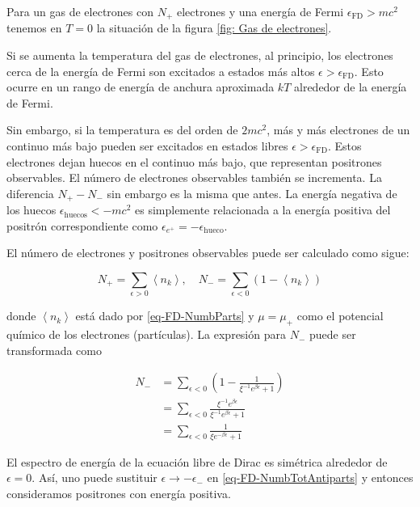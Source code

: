 Para un gas de electrones con ${N}_{+}$ electrones y una energía de Fermi ${\epsilon}_{\mathrm{FD}} > m{c}^{2}$ tenemos en $T=0$ la situación de la figura \ref{fig: Gas de electrones}.

Si se aumenta la temperatura del gas de electrones, al principio, los electrones cerca de la energía de Fermi son excitados a estados más altos ${\epsilon} > {\epsilon}_{\mathrm{FD}}$. Esto ocurre en un rango de energía de anchura aproximada $kT$ alrededor de la energía de Fermi.

Sin embargo, si la temperatura es del orden de $2m{c}^{2}$, más y más electrones de un continuo más bajo pueden ser excitados en estados libres $\epsilon > {\epsilon}_{\mathrm{FD}}$. Estos electrones dejan huecos en el continuo más bajo, que representan positrones observables. El número de electrones observables también se incrementa. La diferencia ${N}_{+} - {N}_{-}$ sin embargo es la misma que antes. La energía negativa de los huecos ${\epsilon}_{\mathrm{huecos}} < - m{c}^{2}$ es simplemente relacionada a la energía positiva del positrón correspondiente como ${\epsilon}_{{e}^{+}} = - {\epsilon}_{\mathrm{hueco}}$.

El número de electrones y positrones observables puede ser calculado como sigue:

\begin{equation}\label{eq-FD-NumbPartsAndAntiparts}
{N}_{+} = \sum_{\epsilon>0} \left\langle {n}_{k} \right\rangle, \quad {N}_{-} = \sum_{\epsilon<0} \left(1 - \left\langle {n}_{k} \right\rangle \right)
\end{equation}

donde $\left\langle {n}_{k} \right\rangle$ está dado por \eqref{eq-FD-NumbParts} y ${\mu} = {\mu}_{+}$ como el potencial químico de los electrones (partículas). La expresión para ${N}_{-}$ puede ser transformada como

\begin{equation}\label{eq-FD-NumbTotAntiparts}
\begin{split}
{N}_{-} & = \sum_{\epsilon < 0} \left( 1 - \frac{1}{{\xi}^{-1}{e}^{\beta{\epsilon}} + 1} \right)  \\
& = \sum_{\epsilon < 0}\frac{{\xi}^{-1}{e}^{\beta \epsilon}}{{\xi}^{-1}{e}^{\beta{\epsilon}} + 1} \\
& = \sum_{\epsilon<0} \frac{1}{{\xi}{e}^{-\beta{\epsilon}} + 1}
\end{split}
\end{equation}

El espectro de energía de la ecuación libre de Dirac es simétrica alrededor de $\epsilon=0$. Así, uno puede sustituir $\epsilon \rightarrow -{\epsilon}_{-}$ en \eqref{eq-FD-NumbTotAntiparts} y entonces consideramos positrones con energía positiva.

